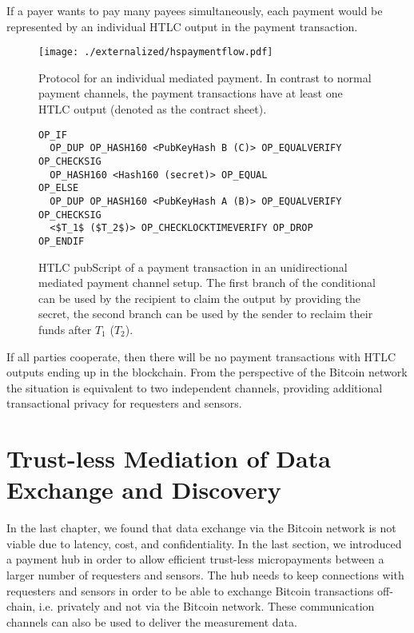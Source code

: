If a payer wants to pay many payees simultaneously, each payment would be represented by an individual \ac{HTLC} output in the payment transaction.

\begin{figure}
\centering
\texttt{[image: ./externalized/hspaymentflow.pdf]}
\caption{Protocol for an individual mediated payment. In contrast to normal payment channels, the payment transactions have at least one \ac{HTLC} output (denoted as the contract sheet).}
\label{fig:unimedpc}
\end{figure}

\begin{figure}
\begin{lstlisting}[breaklines,mathescape=true]
OP_IF
  OP_DUP OP_HASH160 <PubKeyHash B (C)> OP_EQUALVERIFY OP_CHECKSIG
  OP_HASH160 <Hash160 (secret)> OP_EQUAL
OP_ELSE
  OP_DUP OP_HASH160 <PubKeyHash A (B)> OP_EQUALVERIFY OP_CHECKSIG
  <$T_1$ ($T_2$)> OP_CHECKLOCKTIMEVERIFY OP_DROP
OP_ENDIF
\end{lstlisting} 
\caption{\ac{HTLC} pubScript of a payment transaction in an unidirectional mediated payment channel setup. The first branch of the conditional can be used by the recipient to claim the output by providing the secret, the second branch can be used by the sender to reclaim their funds after $T_1$ ($T_2$).}
\label{fig:pubScriptHTLC}
\end{figure}

If all parties cooperate, then there will be no payment transactions with \ac{HTLC} outputs ending up in the blockchain. From the perspective of the Bitcoin network the situation is equivalent to two independent channels, providing additional transactional privacy for requesters and sensors.

\section{Trust-less Mediation of Data Exchange and Discovery}
\label{sec:trust-lessexchange}

In the last chapter, we found that data exchange via the Bitcoin network is not viable due to latency, cost, and confidentiality. In the last section, we introduced a payment hub in order to allow efficient trust-less micropayments between a larger number of requesters and sensors. The hub needs to keep connections with requesters and sensors in order to be able to exchange Bitcoin transactions off-chain, i.e. privately and not via the Bitcoin network. These communication channels can also be used to deliver the measurement data.

